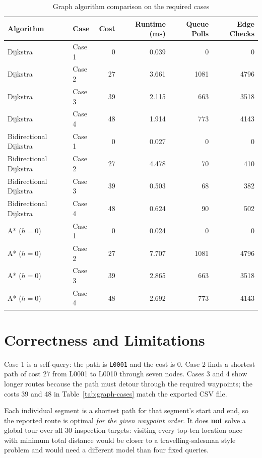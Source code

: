 \documentclass[12pt,a4paper,twocolumn,openany]{report}
\begin{document}
\begin{table}[t]
\centering
\caption{Graph algorithm comparison on the required cases}
\label{tab:graph-algorithm-comparison}
\scriptsize
\setlength{\tabcolsep}{3pt}
\begin{tabular}{llrrrr}
\toprule
Algorithm & Case & Cost & Runtime (ms) & Queue Polls & Edge Checks \\
\midrule
Dijkstra & Case 1 & 0 & 0.039 & 0 & 0 \\
Dijkstra & Case 2 & 27 & 3.661 & 1081 & 4796 \\
Dijkstra & Case 3 & 39 & 2.115 & 663 & 3518 \\
Dijkstra & Case 4 & 48 & 1.914 & 773 & 4143 \\
Bidirectional Dijkstra & Case 1 & 0 & 0.027 & 0 & 0 \\
Bidirectional Dijkstra & Case 2 & 27 & 4.478 & 70 & 410 \\
Bidirectional Dijkstra & Case 3 & 39 & 0.503 & 68 & 382 \\
Bidirectional Dijkstra & Case 4 & 48 & 0.624 & 90 & 502 \\
A* ($h=0$) & Case 1 & 0 & 0.024 & 0 & 0 \\
A* ($h=0$) & Case 2 & 27 & 7.707 & 1081 & 4796 \\
A* ($h=0$) & Case 3 & 39 & 2.865 & 663 & 3518 \\
A* ($h=0$) & Case 4 & 48 & 2.692 & 773 & 4143 \\
\bottomrule
\end{tabular}
\end{table}

\section{Correctness and Limitations}
Case 1 is a self-query: the path is \texttt{L0001} and the cost is 0. 
Case 2 finds a shortest path of cost 27 from L0001 to L0010 through seven nodes. 
Cases 3 and 4 show longer routes because the path must detour through the required waypoints; the costs 39 and 48 in Table~\ref{tab:graph-cases} match the exported CSV file.

Each individual segment is a shortest path for that segment's start and end, so the reported route is optimal \emph{for the given waypoint order}. 
It does \textbf{not} solve a global tour over all 30 inspection targets: visiting every top-ten location once with minimum total distance would be closer to a travelling-salesman style problem and would need a different model than four fixed queries.
\end{document}
